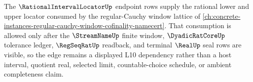 The $\RationalIntervalLocatorUp$ endpoint rows supply the rational lower and upper locator consumed by the regular-Cauchy window lattice of \autoref{ch:concrete-instances-regular-cauchy-window-cofinality-namecert}. That consumption is allowed only after the $\StreamNameUp$ finite window, $\DyadicRatCoreUp$ tolerance ledger, $\RegSeqRatUp$ readback, and terminal $\RealUp$ seal rows are visible, so the edge remains a displayed L10 dependency rather than a host interval, quotient real, selected limit, countable-choice schedule, or ambient completeness claim.

